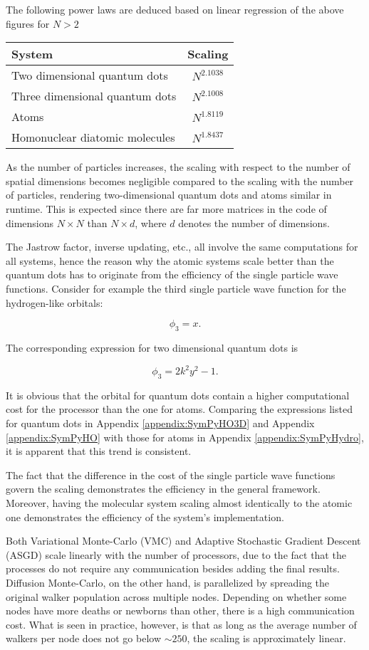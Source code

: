 The following power laws are deduced based on linear regression of the above figures for $N > 2$

\begin{tabular}{l|c}
System & Scaling \\
\hline
Two dimensional quantum dots & $N^{2.1038}$ \\
Three dimensional quantum dots & $N^{2.1008}$ \\
Atoms & $N^{1.8119}$ \\
Homonuclear diatomic molecules & $N^{1.8437}$ \\ 
\end{tabular}


As the number of particles increases, the scaling with respect to the number of spatial dimensions becomes negligible compared to the scaling with the number of particles, rendering two-dimensional quantum dots and atoms similar in runtime. This is expected since there are far more matrices in the code of dimensions $N\times N$ than $N \times d$, where $d$ denotes the number of dimensions. 

The Jastrow factor, inverse updating, etc., all involve the same computations for all systems, hence the reason why the atomic systems scale better than the quantum dots has to originate from the efficiency of the single particle wave functions. Consider for example the third single particle wave function for the hydrogen-like orbitals:

\begin{equation}
 \phi_3 = x.
\end{equation}

The corresponding expression for two dimensional quantum dots is

\begin{equation}
  \phi_3 = 2k^2y^2 - 1.
\end{equation}

It is obvious that the orbital for quantum dots contain a higher computational cost for the processor than the one for atoms. Comparing the expressions listed for quantum dots in Appendix \ref{appendix:SymPyHO3D} and Appendix \ref{appendix:SymPyHO} with those for atoms in Appendix \ref{appendix:SymPyHydro}, it is apparent that this trend is consistent.

The fact that the difference in the cost of the single particle wave functions govern the scaling demonstrates the efficiency in the general framework. Moreover, having the molecular system scaling almost identically to the atomic one demonstrates the efficiency of the system's implementation. 

Both Variational Monte-Carlo (VMC) and Adaptive Stochastic Gradient Descent (ASGD) scale linearly with the number of processors, due to the fact that the processes do not require any communication besides adding the final results. Diffusion Monte-Carlo, on the other hand, is parallelized by spreading the original walker population across multiple nodes. Depending on whether some nodes have more deaths or newborns than other, there is a high communication cost. What is seen in practice, however, is that as long as the average number of walkers per node does not go below $\sim250$, the scaling is approximately linear. 




